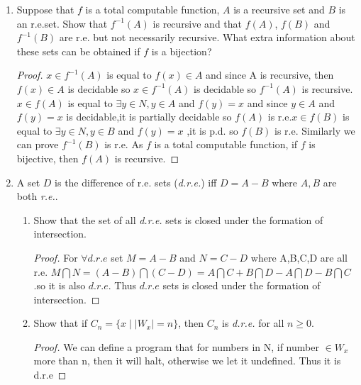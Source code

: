\documentclass[12pt,a4paper]{article}
\theoremstyle{definition}
\numberwithin{equation}{section}
\numberwithin{figure}{section}
\begin{document}
\begin{enumerate}
\item Suppose that $f$ is a total computable function, $A$ is a recursive set and $B$ is an r.e.set. Show that $f^{-1}(A)$ is recursive and that $f(A)$, $f(B)$ and $f^{-1}(B)$ are r.e. but not necessarily recursive. What extra information about these sets can be obtained if $f$ is a bijection?
\begin{proof}
    $x \in f^{-1}(A)$ is equal to $f(x) \in A$ and since A is recursive, then $f(x) \in A$  is decidable so $x \in f^{-1}(A)$ is decidable so $f^{-1}(A)$ is recursive.$x \in f(A)$ is equal to $\exists y \in N,y \in A$ and $f(y)=x$
    and since $y \in A$ and $f(y)=x$ is decidable,it is partially decidable so $f(A)$ is r.e.$x \in f(B)$ is equal to $\exists y \in N,y \in B$ and $f(y)=x$
    ,it is p.d. so $f(B)$ is r.e. Similarly we can prove $f^{-1}(B)$ is r.e. As $f$ is a total computable function, if $f$ is bijective, then $f(A)$ is recursive.
\end{proof}

\item A set $D$ is the difference of r.e. sets (\emph{d.r.e.}) iff $D=A-B$ where $A,B$ are both \emph{r.e.}.
\begin{enumerate}
\item Show that the set of all \emph{d.r.e.} sets is closed under the formation of intersection.
\begin{proof}
    For $\forall d.r.e$ set $M=A-B$ and $N=C-D$ where A,B,C,D are all r.e. $M \bigcap N = (A-B) \bigcap (C-D) = A\bigcap C + B \bigcap D - A \bigcap D - B \bigcap C$.so it is also $d.r.e$. Thus $d.r.e $ sets is closed under the formation of intersection.
\end{proof}
\item Show that if $C_n = \{x \mid |W_x|=n \}$, then $C_n$ is \emph{d.r.e.} for all $n \ge 0$.
\begin{proof}
    We can define a program that for numbers in N, if number $\in W_x$ more than n, then it will halt, otherwise we let it undefined. Thus it is d.r.e
\end{proof}

\end{enumerate}

\end{enumerate}
\end{document}
